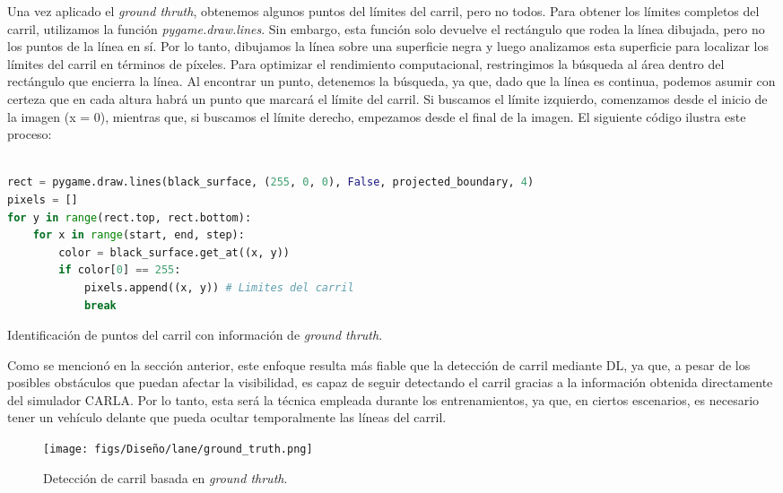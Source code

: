 Una vez aplicado el \textit{ground thruth}, obtenemos algunos puntos del límites del carril, pero no todos. Para obtener los límites completos del carril, utilizamos la función \textit{pygame.draw.lines}. Sin embargo, esta función solo devuelve el rectángulo que rodea la línea dibujada, pero no los puntos de la línea en sí. Por lo tanto, dibujamos la línea sobre una superficie negra y luego analizamos esta superficie para localizar los límites del carril en términos de píxeles. Para optimizar el rendimiento computacional, restringimos la búsqueda al área dentro del rectángulo que encierra la línea. Al encontrar un punto, detenemos la búsqueda, ya que, dado que la línea es continua, podemos asumir con certeza que en cada altura habrá un punto que marcará el límite del carril. Si buscamos el límite izquierdo, comenzamos desde el inicio de la imagen (x = 0), mientras que, si buscamos el límite derecho, empezamos desde el final de la imagen. El siguiente código ilustra este proceso:
\begin{code}[h]
\begin{lstlisting}[language=Python]

rect = pygame.draw.lines(black_surface, (255, 0, 0), False, projected_boundary, 4)
pixels = []
for y in range(rect.top, rect.bottom):
    for x in range(start, end, step):
        color = black_surface.get_at((x, y))
        if color[0] == 255:
            pixels.append((x, y)) # Limites del carril
            break

\end{lstlisting}
\caption[Identificación de puntos del carril con información de \textit{ground thruth}]{Identificación de puntos del carril con información de \textit{ground thruth}.}
\label{cod:gt_carril}
\end{code}

\newpage

Como se mencionó en la sección anterior, este enfoque resulta más fiable que la detección de carril mediante \ac{DL}, ya que, a pesar de los posibles obstáculos que puedan afectar la visibilidad, es capaz de seguir detectando el carril gracias a la información obtenida directamente del simulador CARLA. Por lo tanto, esta será la técnica empleada durante los entrenamientos, ya que, en ciertos escenarios, es necesario tener un vehículo delante que pueda ocultar temporalmente las líneas del carril.

\begin{figure}[ht]
  \centering
  \texttt{[image: figs/Diseño/lane/ground\_truth.png]}
  \caption{Detección de carril basada en \textit{ground thruth}.}
  \label{fig:gt_final_carril}
\end{figure}


